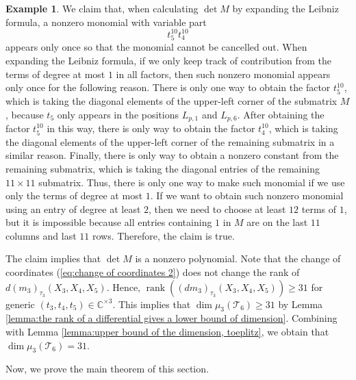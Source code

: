 \documentclass[reqno]{amsart}
\theoremstyle{definition}
\newtheorem{example}[theorem]{Example}
\numberwithin{equation}{section}
\begin{document}
\begin{example}
    We claim that, when calculating $\det M$ by expanding the Leibniz formula, a nonzero monomial with variable part
    \begin{equation*}
        t_5^{10}t_4^{10}
    \end{equation*}
    appears only once so that the monomial cannot be cancelled out. When expanding the Leibniz formula, if we only keep track of contribution from the terms of degree at most $1$ in all factors, then such nonzero monomial  appears only once for the following reason. There is only one way to obtain the factor $t_5^{10}$, which is taking the diagonal elements of the upper-left corner of the submatrix $M$, because $t_5$ only appears in the positions $L_{p,1}$ and $L_{p,6}$. After obtaining the factor $t_5^{10}$ in this way, there is only way to obtain the factor $t_4^{10}$, which is taking the diagonal elements of the upper-left corner of the remaining submatrix in a similar reason. Finally, there is only way to obtain a nonzero constant from the remaining submatrix, which is taking the diagonal entries of the remaining $11 \times 11$ submatrix. Thus, there is only one way to make such monomial if we use only the terms of degree at most $1$. If we want to obtain such nonzero monomial using an entry of degree at least $2$, then we need to choose at least $12$ terms of $1$, but it is impossible because all entries containing $1$ in $M$ are on the last $11$ columns and last $11$ rows. Therefore, the claim is true. 
    
    The claim implies that $\det M$ is a nonzero polynomial. Note that the change of coordinates (\ref{eq:change of coordinates 2}) does not change the rank of $d(m_3)_{\tau_3}(X_3,X_4,X_5)$. Hence, $\operatorname{rank} ((dm_3)_{\tau_3}(X_3,X_4,X_5)) \geq 31$ for generic $(t_3,t_4,t_5) \in \mathbb{C}^{\times 3}$. This implies that $\dim \mu_3(\mathcal{T}_6) \geq 31$ by Lemma \ref{lemma:the rank of a differential gives a lower bound of dimension}. Combining with Lemma \ref{lemma:upper bound of the dimension, toeplitz}, we obtain that $\dim \mu_3(\mathcal{T}_6)=31$.
\end{example}

Now, we prove the main theorem of this section.
\end{document}
